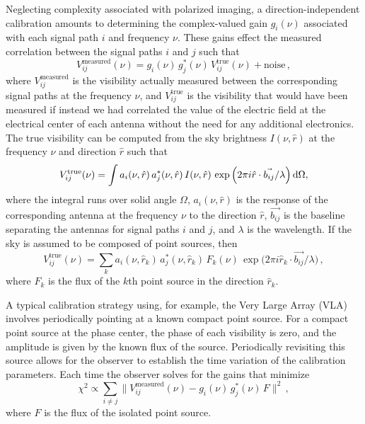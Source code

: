 \begin{bibunit}
Neglecting complexity associated with polarized imaging, a direction-independent calibration amounts
to determining the complex-valued gain $g_i(\nu)$ associated with each signal path $i$ and frequency
$\nu$. These gains effect the measured correlation between the signal paths $i$ and $j$ such that
\begin{equation}
    V_{ij}^\text{measured}(\nu) = g_i(\nu)\,g_j^*(\nu)\,V_{ij}^\text{true}(\nu)
        + \text{noise}\,,
\end{equation}
where $V_{ij}^\text{measured}$ is the visibility actually measured between the corresponding signal
paths at the frequency $\nu$, and $V_{ij}^\text{true}$ is the visibility that would have been
measured if instead we had correlated the value of the electric field at the electrical center of
each antenna without the need for any additional electronics. The true visibility
can be computed from the sky brightness $I(\nu, \hat{r})$ at the
frequency $\nu$ and direction $\hat r$ such that
\begin{equation}
    V_{ij}^\text{true}(\nu) = \int a_i(\nu, \hat{r})\,a_j^*(\nu, \hat{r})\,I(\nu, \hat{r})\,
        \exp\Big(2\pi i\hat{r}\cdot\vec{b_{ij}}/\lambda\Big)\,{\textrm d}\Omega,
\end{equation}
where the integral runs over solid angle $\Omega$, $a_i(\nu, \hat{r})$ is the response of the
corresponding antenna at the frequency $\nu$ to the direction $\hat{r}$, $\vec{b_{ij}}$ is the
baseline separating the antennas for signal paths $i$ and $j$, and $\lambda$ is the wavelength.  If
the sky is assumed to be composed of point sources, then
\begin{equation}\label{eq:antenna-response-point-sources}
    V_{ij}^\text{true}(\nu) = \sum_k a_i(\nu, \hat{r}_k)\,a_j^*(\nu, \hat{r}_k)\,F_k(\nu)\,
        \exp\Big(2\pi i\hat{r}_k\cdot\vec{b_{ij}}/\lambda\Big)\,,
\end{equation}
where $F_k$ is the flux of the $k$th point source in the direction $\hat{r}_k$.

A typical calibration strategy using, for example, the Very Large Array (VLA) involves periodically
pointing at a known compact point source. For a compact point source at the phase center, the phase
of each visibility is zero, and the amplitude is given by the known flux of the source.
Periodically revisiting this source allows for the observer to establish the time variation of the
calibration parameters. Each time the observer solves for the gains that minimize
\begin{equation}
    \chi^2 \propto \sum_{i \neq j}
        \Big\|V_{ij}^\text{measured}(\nu) - g_i(\nu)\,g_j^*(\nu)\,F\Big\|^2\,,
\end{equation}
where $F$ is the flux of the isolated point source.


\end{bibunit}
